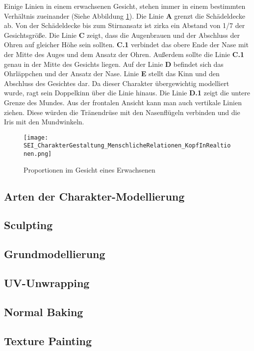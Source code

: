 Einige Linien in einem erwachsenen Gesicht, stehen immer in einem bestimmten Verhältnis zueinander
(Siehe Abbildung \ref{blender:proportions}). Die Linie \textbf{A} grenzt die Schädeldecke ab. Von
der Schädeldecke bis zum Stirnansatz ist zirka ein Abstand von 1/7 der Gesichtsgröße. Die Linie
\textbf{C} zeigt, dass die Augenbrauen und der Abschluss der Ohren auf gleicher Höhe sein sollten.
\textbf{C.1} verbindet das obere Ende der Nase mit der Mitte des Auges und dem Ansatz der Ohren.
Außerdem sollte die Linie  \textbf{C.1} genau in der Mitte des Gesichts liegen. Auf der Linie
\textbf{D} befindet sich das Ohrläppchen und der Ansatz der Nase. Linie  \textbf{E} stellt das Kinn
und den Abschluss des Gesichtes dar. Da dieser Charakter übergewichtig modelliert wurde, ragt sein
Doppelkinn über die Linie hinaus. Die Linie  \textbf{D.1} zeigt die untere Grenze des Mundes.
Aus der frontalen Ansicht kann man auch vertikale Linien ziehen. Diese würden die Tränendrüse mit den Nasenflügeln
verbinden und die Iris mit den Mundwinkeln. \citep{book:kunst_des_zeichnens}
\begin{figure}[h]
    \centering
    \texttt{[image: SEI\_CharakterGestaltung\_MenschlicheRelationen\_KopfInRealtionen.png]}
    \caption{Proportionen im Gesicht eines Erwachsenen}
    \label{blender:proportions}
\end{figure}

\subsection{Arten der Charakter-Modellierung}
\subsection{Sculpting}
\subsection{Grundmodellierung}
\subsection{UV-Unwrapping}
\subsection{Normal Baking}
\subsection{Texture Painting}
